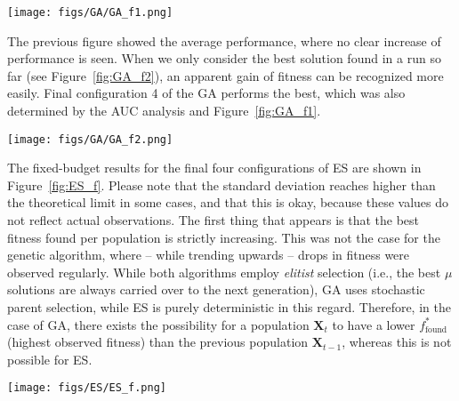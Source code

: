 \documentclass{article}
\begin{document}
\begin{figure*}[htbp]
    \centering
    \texttt{[image: figs/GA/GA\_f1.png]}
    \captionsetup{width=.7\textwidth}
    \caption{
        Best fitness found per population for the final four configurations of GA.
        Fixed parameters are not reflected in the labels, but can be found in Table~\ref{tab:GA_final_configs}.
    }
    \label{fig:GA_f1}
\end{figure*}

\newpage

The previous figure showed the average performance, where no clear increase of performance is seen.
When we only consider the best solution found in a run so far (see Figure~\ref{fig:GA_f2}), an apparent gain of fitness can be recognized more easily.
Final configuration 4 of the GA performs the best, which was also determined by the AUC analysis and Figure~\ref{fig:GA_f1}.

\begin{figure*}[htbp]
    \centering
    \texttt{[image: figs/GA/GA\_f2.png]}
    \captionsetup{width=.75\textwidth}
    \caption{Best fitness found so far (over the course of the optimization process) for the final four configurations of GA.}
    \label{fig:GA_f2}
\end{figure*}

The fixed-budget results for the final four configurations of ES are shown in Figure~\ref{fig:ES_f}.
Please note that the standard deviation reaches higher than the theoretical limit in some cases, and that this is okay, because these values do not reflect actual observations.
The first thing that appears is that the best fitness found per population is strictly increasing.
This was not the case for the genetic algorithm, where -- while trending upwards -- drops in fitness were observed regularly.
While both algorithms employ \textit{elitist} selection (i.e., the best $\mu$ solutions are always carried over to the next generation), GA uses stochastic parent selection, while ES is purely deterministic in this regard.
Therefore, in the case of GA, there exists the possibility for a population $\mathbf{X}_t$ to have a lower $f^*_{\mathrm{found}}$ (highest observed fitness) than the previous population $\mathbf{X}_{t-1}$, whereas this is not possible for ES.

\begin{figure*}[htbp]
    \centering
    \texttt{[image: figs/ES/ES\_f.png]}
    \captionsetup{width=.75\textwidth}
    \caption{
        Best fitness found per population for the final four configurations of ES.
        Fixed parameters are not reflected in the labels, but can be found in Table~\ref{tab:ES_final_configs}.
    }
    \label{fig:ES_f}
\end{figure*}
\end{document}
